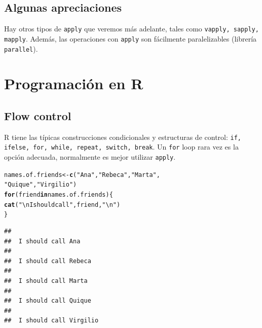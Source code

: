 \documentclass{config/apuntes}\usepackage[]{graphicx}\usepackage[]{xcolor}
\makeatletter
\newcommand{\hlsng}[1]{\textcolor[rgb]{0.192,0.494,0.8}{#1}}%
\newcommand{\hldef}[1]{\textcolor[rgb]{0.345,0.345,0.345}{#1}}%
\newcommand{\hlkwa}[1]{\textcolor[rgb]{0.161,0.373,0.58}{\textbf{#1}}}%
\newcommand{\hlkwb}[1]{\textcolor[rgb]{0.69,0.353,0.396}{#1}}%
\newcommand{\hlkwd}[1]{\textcolor[rgb]{0.737,0.353,0.396}{\textbf{#1}}}%
\newenvironment{kframe}{%
 \def\at@end@of@kframe{}%
 \ifinner\ifhmode%
  \def\at@end@of@kframe{\end{minipage}}%
  \begin{minipage}{\columnwidth}%
 \fi\fi%
 \def\FrameCommand##1{\hskip\@totalleftmargin \hskip-\fboxsep
 \colorbox{shadecolor}{##1}\hskip-\fboxsep
     \hskip-\linewidth \hskip-\@totalleftmargin \hskip\columnwidth}%
 \MakeFramed {\advance\hsize-\width
   \@totalleftmargin\z@ \linewidth\hsize
   \@setminipage}}%
 {\par\unskip\endMakeFramed%
 \at@end@of@kframe}
\newenvironment{knitrout}{}{} %
\newcommand{\code}[1]{\texttt{#1}}
\makeatother
\begin{document}
\section{Algunas apreciaciones}
Hay otros tipos de \code{apply} que veremos más adelante, tales como \code{vapply, sapply, mapply}. Además, las operaciones con \code{apply} son fácilmente paralelizables (librería \code{parallel}).

\chapter{Programación en R}
\section{Flow control}
R tiene las típicas construcciones condicionales y estructuras de control: \code{if, ifelse, for, while, repeat, switch, break}. Un \code{for} loop rara vez es la opción adecuada, normalmente es mejor utilizar \code{apply}.

\begin{knitrout}
\color{fgcolor}\begin{kframe}
\begin{alltt}
\hldef{names.of.friends} \hlkwb{<-} \hlkwd{c}\hldef{(}\hlsng{"Ana"}\hldef{,} \hlsng{"Rebeca"}\hldef{,} \hlsng{"Marta"}\hldef{,}
                      \hlsng{"Quique"}\hldef{,} \hlsng{"Virgilio"}\hldef{)}
\hlkwa{for}\hldef{(friend} \hlkwa{in} \hldef{names.of.friends) \{}
  \hlkwd{cat}\hldef{(}\hlsng{"\textbackslash{}n I should call"}\hldef{, friend,} \hlsng{"\textbackslash{}n"}\hldef{)}
\hldef{\}}
\end{alltt}
\begin{verbatim}
## 
##  I should call Ana 
## 
##  I should call Rebeca 
## 
##  I should call Marta 
## 
##  I should call Quique 
## 
##  I should call Virgilio
\end{verbatim}
\end{kframe}
\end{knitrout}
\end{document}
